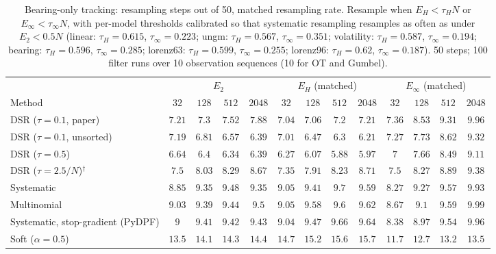 \begin{table}[ht]
\centering
\small
\caption{Bearing-only tracking: resampling steps out of 50, matched resampling rate. Resample when $E_H<\tau_HN$ or $E_\infty<\tau_\infty N$, with per-model thresholds calibrated so that systematic resampling resamples as often as under $E_2<0.5N$ (linear: $\tau_H{=}0.615$, $\tau_\infty{=}0.223$; ungm: $\tau_H{=}0.567$, $\tau_\infty{=}0.351$; volatility: $\tau_H{=}0.587$, $\tau_\infty{=}0.194$; bearing: $\tau_H{=}0.596$, $\tau_\infty{=}0.285$; lorenz63: $\tau_H{=}0.599$, $\tau_\infty{=}0.255$; lorenz96: $\tau_H{=}0.62$, $\tau_\infty{=}0.187$). 50 steps; 100 filter runs over 10 observation sequences (10 for OT and Gumbel).}
\label{tab:trigger-matched-bearing-resampling_steps}
\begin{adjustbox}{max width=\linewidth}
\begin{tabular}{lcccc|cccc|cccc}
\toprule
 & \multicolumn{4}{c}{$E_2$} & \multicolumn{4}{c}{$E_H$ (matched)} & \multicolumn{4}{c}{$E_\infty$ (matched)} \\
\cmidrule(lr){2-5} \cmidrule(lr){6-9} \cmidrule(lr){10-13}
Method & $32$ & $128$ & $512$ & $2048$ & $32$ & $128$ & $512$ & $2048$ & $32$ & $128$ & $512$ & $2048$ \\
\midrule
DSR ($\tau{=}0.1$, paper) & $7.21$ & $7.3$ & $7.52$ & $7.88$ & $7.04$ & $7.06$ & $7.2$ & $7.21$ & $7.36$ & $8.53$ & $9.31$ & $9.96$ \\
DSR ($\tau{=}0.1$, unsorted) & $7.19$ & $6.81$ & $6.57$ & $6.39$ & $7.01$ & $6.47$ & $6.3$ & $6.21$ & $7.27$ & $7.73$ & $8.62$ & $9.32$ \\
DSR ($\tau{=}0.5$) & $6.64$ & $6.4$ & $6.34$ & $6.39$ & $6.27$ & $6.07$ & $5.88$ & $5.97$ & $7$ & $7.66$ & $8.49$ & $9.11$ \\
DSR ($\tau{=}2.5/N$)$^\dagger$ & $7.5$ & $8.03$ & $8.29$ & $8.67$ & $7.35$ & $7.91$ & $8.23$ & $8.71$ & $7.5$ & $8.27$ & $8.89$ & $9.38$ \\
\midrule
Systematic & $8.85$ & $9.35$ & $9.48$ & $9.35$ & $9.05$ & $9.41$ & $9.7$ & $9.59$ & $8.27$ & $9.27$ & $9.57$ & $9.93$ \\
Multinomial & $9.03$ & $9.39$ & $9.44$ & $9.5$ & $9.05$ & $9.58$ & $9.6$ & $9.62$ & $8.67$ & $9.1$ & $9.59$ & $9.99$ \\
Systematic, stop-gradient (PyDPF) & $9$ & $9.41$ & $9.42$ & $9.43$ & $9.04$ & $9.47$ & $9.66$ & $9.64$ & $8.38$ & $8.97$ & $9.54$ & $9.96$ \\
Soft ($\alpha{=}0.5$) & $13.5$ & $14.1$ & $14.3$ & $14.4$ & $14.7$ & $15.2$ & $15.6$ & $15.7$ & $11.7$ & $12.7$ & $13.2$ & $13.5$ \\

\end{tabular}
\end{adjustbox}
\end{table}

